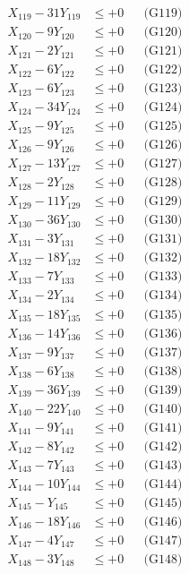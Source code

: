 \documentclass[a4paper,10pt]{article}
\begin{document}
{\begin{align}
X_{119} - 31Y_{119} &\leq +0 && \text{(G119)} \\
X_{120} - 9Y_{120} &\leq +0 && \text{(G120)} \\
X_{121} - 2Y_{121} &\leq +0 && \text{(G121)} \\
X_{122} - 6Y_{122} &\leq +0 && \text{(G122)} \\
X_{123} - 6Y_{123} &\leq +0 && \text{(G123)} \\
\allowbreak
X_{124} - 34Y_{124} &\leq +0 && \text{(G124)} \\
X_{125} - 9Y_{125} &\leq +0 && \text{(G125)} \\
X_{126} - 9Y_{126} &\leq +0 && \text{(G126)} \\
X_{127} - 13Y_{127} &\leq +0 && \text{(G127)} \\
X_{128} - 2Y_{128} &\leq +0 && \text{(G128)} \\
X_{129} - 11Y_{129} &\leq +0 && \text{(G129)} \\
X_{130} - 36Y_{130} &\leq +0 && \text{(G130)} \\
X_{131} - 3Y_{131} &\leq +0 && \text{(G131)} \\
X_{132} - 18Y_{132} &\leq +0 && \text{(G132)} \\
X_{133} - 7Y_{133} &\leq +0 && \text{(G133)} \\
\allowbreak
X_{134} - 2Y_{134} &\leq +0 && \text{(G134)} \\
X_{135} - 18Y_{135} &\leq +0 && \text{(G135)} \\
X_{136} - 14Y_{136} &\leq +0 && \text{(G136)} \\
X_{137} - 9Y_{137} &\leq +0 && \text{(G137)} \\
X_{138} - 6Y_{138} &\leq +0 && \text{(G138)} \\
X_{139} - 36Y_{139} &\leq +0 && \text{(G139)} \\
X_{140} - 22Y_{140} &\leq +0 && \text{(G140)} \\
X_{141} - 9Y_{141} &\leq +0 && \text{(G141)} \\
X_{142} - 8Y_{142} &\leq +0 && \text{(G142)} \\
X_{143} - 7Y_{143} &\leq +0 && \text{(G143)} \\
\allowbreak
X_{144} - 10Y_{144} &\leq +0 && \text{(G144)} \\
X_{145} - Y_{145} &\leq +0 && \text{(G145)} \\
X_{146} - 18Y_{146} &\leq +0 && \text{(G146)} \\
X_{147} - 4Y_{147} &\leq +0 && \text{(G147)} \\
X_{148} - 3Y_{148} &\leq +0 && \text{(G148)} \\

\end{align}}
\end{document}
